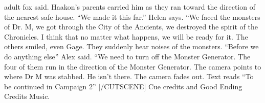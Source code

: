 \documentclass{gd-document}
\begin{document}
\begin{enumerate}
\begin{enumerate}
      adult fox said. Haakon's parents carried him as they ran toward
      the direction of the nearest safe house.  “We made it this far.”
      Helen says. “We faced the monsters of Dr. M, we got through the
      City of the Ancients, we destroyed the spirit of the
      Chronicles. I think that no matter what happens, we will be
      ready for it. The others smiled, even Gage. They suddenly hear
      noises of the monsters. “Before we do anything else” Alex
      said. “We need to turn off the Monster Generator. The four of
      them run in the direction of the Monster Generator. The camera
      points to where Dr M was stabbed. He isn't there. The camera
      fades out. Text reads “To be continued in Campaign 2”
      [/CUTSCENE] Cue credits and Good Ending Credits Music.
    \end{enumerate}
\end{enumerate}
\end{document}
